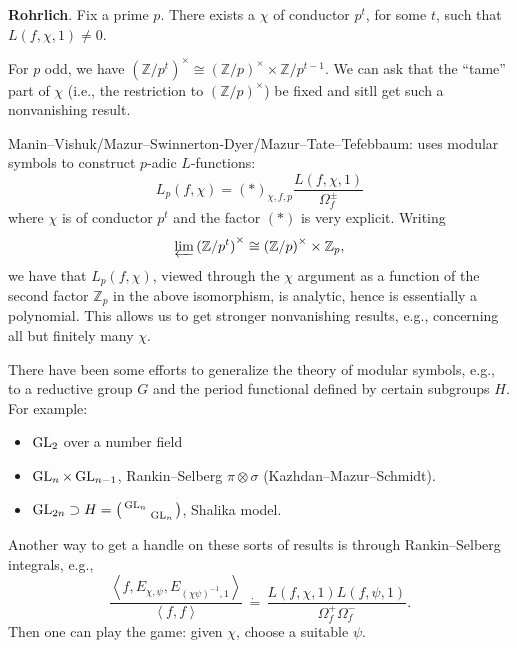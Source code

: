 \documentclass[reqno]{amsart} 
\begin{document}
\textbf{Rohrlich}.  Fix a prime $p$.  There exists a $\chi$ of conductor $p^t$, for some $t$, such that $L(f, \chi, 1) \neq 0$.

For $p$ odd, we have $(\mathbb{Z} / p^t)^\times \cong (\mathbb{Z} / p)^\times \times \mathbb{Z} / p^{t - 1}$.  We can ask that the ``tame'' part of $\chi$ (i.e., the restriction to ${(\mathbb{Z} / p)}^\times$) be fixed and sitll get such a nonvanishing result.

Manin--Vishuk/Mazur--Swinnerton-Dyer/Mazur--Tate--Tefebbaum: uses modular symbols to construct $p$-adic $L$-functions:
\begin{equation*}
  L_p(f, \chi) ={(\ast)}_{\chi, f, p} \frac{L(f, \chi, 1)}{ \Omega_f^{\pm}}
\end{equation*}
where $\chi$ is of conductor $p^t$ and the factor $(\ast)$ is very explicit.  Writing
\begin{equation*}
  \varprojlim {(\mathbb{Z} / p^t)}^\times \cong {(\mathbb{Z} / p )}^\times \times \mathbb{Z}_p,
\end{equation*}
we have that $L_p(f, \chi )$, viewed through the $\chi$ argument as a function of the second factor $\mathbb{Z}_p$ in the above isomorphism, is analytic, hence is essentially a polynomial.  This allows us to get stronger nonvanishing results, e.g., concerning all but finitely many $\chi$.

There have been some efforts to generalize the theory of modular symbols, e.g., to a reductive group $G$ and the period functional defined by certain subgroups $H$.  For example:
\begin{itemize}
\item $\operatorname{GL}_2$ over a number field
\item $\operatorname{GL}_n \times \operatorname{GL}_{n - 1}$, Rankin--Selberg $\pi \otimes \sigma$ (Kazhdan--Mazur--Schmidt).
\item $\operatorname{GL}_{2 n} \supset H = \left(
    \begin{smallmatrix}
      \operatorname{GL}_n&\\
           &\operatorname{GL}_n \\
    \end{smallmatrix}
  \right)$, Shalika model.
\end{itemize}

Another way to get a handle on these sorts of results is through Rankin--Selberg integrals, e.g.,
\begin{equation*}
  \frac{\left\langle f, E_{\chi, \psi },
      E_{{(\chi \psi)}^{-1}, 1}\right\rangle}{\left\langle f, f \right\rangle}
  \, \dot{=} \,
  \frac{L(f, \chi, 1)
    L(f, \psi, 1)}{\Omega_f^+ \Omega_f^- }.
\end{equation*}
Then one can play the game: given $\chi$, choose a suitable $\psi$.
\end{document}
